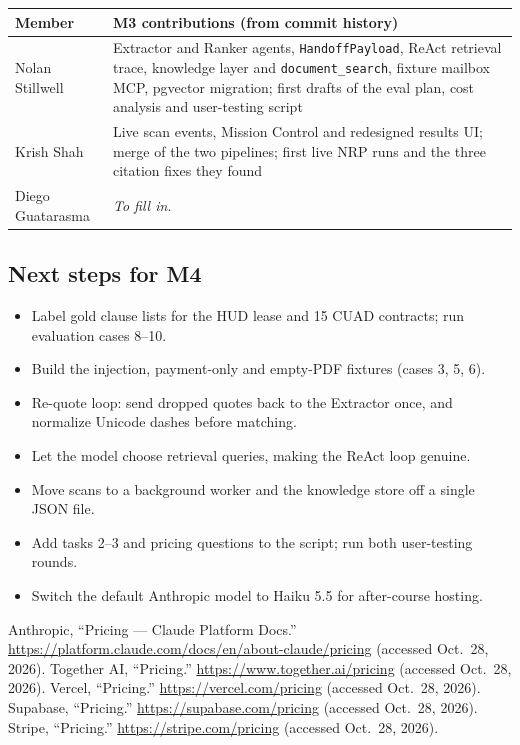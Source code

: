 \documentclass[11pt,letterpaper]{article}
\newcommand{\code}[1]{\texttt{#1}}
\begin{document}
\begin{table}[htbp]
\centering
\small
\begin{tabularx}{\textwidth}{@{}p{3.0cm}L@{}}
\toprule
\textbf{Member} & \textbf{M3 contributions (from commit history)} \\
\midrule
Nolan Stillwell & Extractor and Ranker agents, \code{HandoffPayload}, ReAct retrieval trace, knowledge layer and \code{document\_search}, fixture mailbox MCP, pgvector migration; first drafts of the eval plan, cost analysis and user-testing script \\
Krish Shah & Live scan events, Mission Control and redesigned results UI; merge of the two pipelines; first live NRP runs and the three citation fixes they found \\
Diego Guatarasma & \textit{To fill in.} \\
\bottomrule
\end{tabularx}
\end{table}

\subsection{Next steps for M4}

\begin{itemize}[label=$\square$]
  \item Label gold clause lists for the HUD lease and 15 CUAD contracts; run evaluation cases 8--10.
  \item Build the injection, payment-only and empty-PDF fixtures (cases 3, 5, 6).
  \item Re-quote loop: send dropped quotes back to the Extractor once, and normalize Unicode dashes before matching.
  \item Let the model choose retrieval queries, making the ReAct loop genuine.
  \item Move scans to a background worker and the knowledge store off a single JSON file.
  \item Add tasks 2--3 and pricing questions to the script; run both user-testing rounds.
  \item Switch the default Anthropic model to Haiku 5.5 for after-course hosting.
\end{itemize}

\begin{thebibliography}{9}
 Anthropic, ``Pricing --- Claude Platform Docs.'' \url{https://platform.claude.com/docs/en/about-claude/pricing} (accessed Oct.\ 28, 2026).
 Together AI, ``Pricing.'' \url{https://www.together.ai/pricing} (accessed Oct.\ 28, 2026).
 Vercel, ``Pricing.'' \url{https://vercel.com/pricing} (accessed Oct.\ 28, 2026).
 Supabase, ``Pricing.'' \url{https://supabase.com/pricing} (accessed Oct.\ 28, 2026).
 Stripe, ``Pricing.'' \url{https://stripe.com/pricing} (accessed Oct.\ 28, 2026).
\end{thebibliography}
\end{document}
